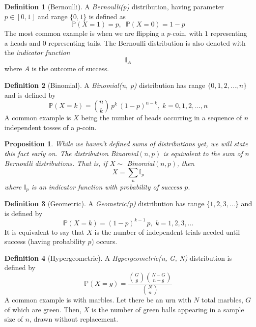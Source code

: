 \documentclass{article}
\newtheorem{proposition}[theorem]{Proposition}
\theoremstyle{remark}
\theoremstyle{definition}
\newtheorem{definition}{Definition}[section]
\begin{document}
\begin{definition}[Bernoulli]
A \textit{Bernoulli(p)} distribution, having parameter $p \in [0,1]$ and range $\{0, 1\}$ is defined as 
\[\mathbb{P}(X = 1) = p, \;\; \mathbb{P}(X = 0) = 1-p\]
The most common example is when we are flipping a $p$-coin, with $1$ representing a heads and $0$ representing tails. The Bernoulli distribution is also denoted with the \textit{indicator function}
\[\mathbb{I}_A\]
where $A$ is the outcome of success. 
\end{definition}

\begin{definition}[Binomial]
A \textit{Binomial(n, p)} distribution has range $\{0, 1, 2, ..., n\}$ and is defined by 
\[\mathbb{P}(X = k) = {n \choose k} \, p^k \, (1-p)^{n-k}, \; k = 0, 1, 2, ..., n\]
A common example is $X$ being the number of heads occurring in a sequence of $n$ independent tosses of a $p$-coin. 
\end{definition}

\begin{proposition}
While we haven't defined sums of distributions yet, we will state this fact early on. The distribution Binomial$(n, p)$ is equivalent to the sum of $n$ Bernoulli distributions. That is, if $X \sim$ Binomial$(n, p)$, then 
\[X = \sum_{n} \mathbb{I}_p \]
where $\mathbb{I}_p$ is an indicator function with probability of success $p$. 
\end{proposition}

\begin{definition}[Geometric]
A \textit{Geometric(p)} distribution has range $\{1, 2, 3, ...\}$ and is defined by
\[\mathbb{P}(X = k) = (1-p)^{k-1} \, p, \; k = 1, 2, 3, ...\]
It is equivalent to say that $X$ is the number of independent trials needed until success (having probability $p$) occurs. 
\end{definition}

\begin{definition}[Hypergeometric]
A \textit{Hypergeometric(n, G, N)} distribution is defined by 
\[\mathbb{P}(X = g) = \frac{{G \choose g} {{N-G} \choose {n-g}}}{{N \choose n}}\]
A common example is with marbles. Let there be an urn with $N$ total marbles, $G$ of which are green. Then, $X$ is the number of green balls appearing in a sample size of $n$, drawn without replacement. 
\end{definition}
\end{document}
